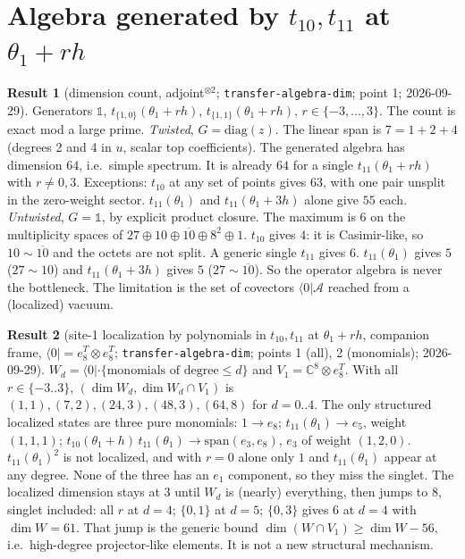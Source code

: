 \documentclass[11pt]{article}
\newcommand{\nb}[1]{\texttt{#1}}
\theoremstyle{definition}
\newtheorem{result}{Result}
\theoremstyle{remark}
\begin{document}
\section{Algebra generated by $t_{10},t_{11}$ at $\theta_1+rh$}

\begin{result}[{dimension count, adjoint$^{\otimes2}$; \nb{transfer-algebra-dim}; point 1; 2026-09-29}]
Generators $\mathbb 1$, $t_{\{1,0\}}(\theta_1+rh)$, $t_{\{1,1\}}(\theta_1+rh)$, $r\in\{-3,\dots,3\}$. The count is exact mod a large prime.
\emph{Twisted}, $G=\mathrm{diag}(z)$. The linear span is $7=1+2+4$ (degrees 2 and 4 in $u$, scalar top coefficients). The generated algebra has dimension $64$, i.e.\ simple spectrum. It is already $64$ for a single $t_{11}(\theta_1+rh)$ with $r\neq0,3$.
Exceptions: $t_{10}$ at any set of points gives $63$, with one pair unsplit in the zero-weight sector. $t_{11}(\theta_1)$ and $t_{11}(\theta_1+3h)$ alone give $55$ each.
\emph{Untwisted}, $G=\mathbb 1$, by explicit product closure. The maximum is $6$ on the multiplicity spaces of $27\oplus10\oplus\overline{10}\oplus8^{2}\oplus1$.
$t_{10}$ gives $4$: it is Casimir-like, so $10\sim\overline{10}$ and the octets are not split. A generic single $t_{11}$ gives $6$.
$t_{11}(\theta_1)$ gives $5$ ($27\sim10$) and $t_{11}(\theta_1+3h)$ gives $5$ ($27\sim\overline{10}$).
So the operator algebra is never the bottleneck. The limitation is the set of covectors $\langle0|\mathcal A$ reached from a (localized) vacuum.
\end{result}

\begin{result}[{site-1 localization by polynomials in $t_{10},t_{11}$ at $\theta_1+rh$, companion frame, $\langle0|=e_8^T\otimes e_8^T$; \nb{transfer-algebra-dim}; points 1 (all), 2 (monomials); 2026-09-29}]
$W_d=\langle0|\cdot\{\text{monomials of degree}\le d\}$ and $V_1=\mathbb C^8\otimes e_8^T$. With all $r\in\{-3..3\}$, $(\dim W_d,\dim W_d\cap V_1)$ is $(1,1),(7,2),(24,3),(48,3),(64,8)$ for $d=0..4$.
The only structured localized states are three pure monomials:
$1\to e_8$; $t_{11}(\theta_1)\to e_5$, weight $(1,1,1)$; $t_{10}(\theta_1+h)\,t_{11}(\theta_1)\to \mathrm{span}(e_3,e_8)$, $e_3$ of weight $(1,2,0)$.
$t_{11}(\theta_1)^2$ is not localized, and with $r=0$ alone only $1$ and $t_{11}(\theta_1)$ appear at any degree. None of the three has an $e_1$ component, so they miss the singlet.
The localized dimension stays at $3$ until $W_d$ is (nearly) everything, then jumps to $8$, singlet included: all $r$ at $d=4$; $\{0,1\}$ at $d=5$; $\{0,3\}$ gives $6$ at $d=4$ with $\dim W=61$.
That jump is the generic bound $\dim(W\cap V_1)\ge\dim W-56$, i.e.\ high-degree projector-like elements. It is not a new structural mechanism.
\end{result}
\end{document}
